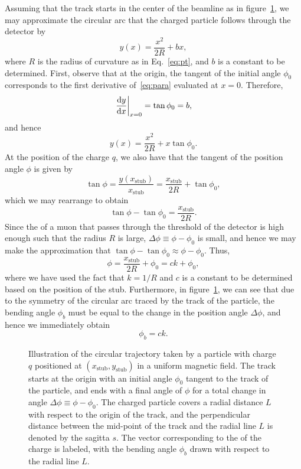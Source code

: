 Assuming that the track starts in the center of the beamline as in figure~\ref{fig:arc}, we may approximate the circular arc that the charged particle follows through the detector by
\begin{equation}\label{eq:para}
  y(x)=\frac{x^2}{2R}+bx,
\end{equation}
where $R$ is the radius of curvature as in Eq.~\ref{eq:pt}, and $b$ is a constant to be determined.
First, observe that at the origin, the tangent of the initial angle $\phi_0$ corresponds to the first derivative of~\ref{eq:para} evaluated at $x=0$. Therefore,
\begin{equation}
  \eval{\dv{y}{x}}_{x=0}=\tan\phi_0=b,
\end{equation}
and hence
\begin{equation}
  y(x)=\frac{x^2}{2R}+x\tan\phi_0.
\end{equation}
At the position of the charge $q$, we also have that the tangent of the position angle $\phi$ is given by
\begin{equation}
  \tan\phi=\frac{y(x_\mathrm{stub})}{x_\mathrm{stub}}=\frac{x_\mathrm{stub}}{2R}+\tan\phi_0,
\end{equation}
which we may rearrange to obtain
\begin{equation}
  \tan\phi-\tan\phi_0=\frac{x_\mathrm{stub}}{2R}.
\end{equation}
Since the \pt of a muon that passes through the threshold of the detector is high enough such that the radius $R$ is large, $\Delta\phi\equiv\phi-\phi_0$ is small, and hence we may make the approximation that $\tan\phi-\tan\phi_0\approx\phi-\phi_0$.
Thus,
\begin{equation}\label{eq:phi}
  \phi=\frac{x_\mathrm{stub}}{2R}+\phi_0=ck+\phi_0,
\end{equation}
where we have used the fact that $k=1/R$ and $c$ is a constant to be determined based on the position of the stub.
Furthermore, in figure~\ref{fig:arc}, we can see that due to the symmetry of the circular arc traced by the track of the particle, the bending angle $\phi_b$ must be equal to the change in the position angle $\Delta\phi$, and hence we immediately obtain
\begin{equation}\label{eq:phib}
  \phi_b=ck.
\end{equation}

\begin{figure}[htbp]
  \centering
  
  \caption{
    Illustration of the circular trajectory taken by a particle with charge $q$ positioned at $(x_\mathrm{stub},y_\mathrm{stub})$ in a uniform magnetic field.
    The track starts at the origin with an initial angle $\phi_0$ tangent to the track of the particle, and ends with a final angle of $\phi$ for a total change in angle $\Delta\phi\equiv\phi-\phi_0$.
    The charged particle covers a radial distance $L$ with respect to the origin of the track, and the perpendicular distance between the mid-point of the track and the radial line $L$ is denoted by the sagitta $s$.
    The vector corresponding to the \pt of the charge is labeled, with the bending angle $\phi_b$ drawn with respect to the radial line $L$.
  }
  \label{fig:arc}
\end{figure}

